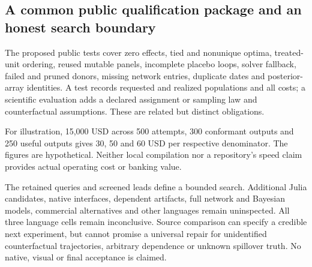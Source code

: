 \subsection{A common public qualification package and an honest search boundary}
The proposed public tests cover zero effects, tied and nonunique optima,
treated-unit ordering, reused mutable panels, incomplete placebo loops,
solver fallback, failed and pruned donors, missing network entries,
duplicate dates and posterior-array identities. A test records requested
and realized populations and all costs; a scientific evaluation adds a
declared assignment or sampling law and counterfactual assumptions.
These are related but distinct obligations.\citep{exec25_synthcross_choice}

For illustration, 15,000 USD across 500 attempts, 300 conformant outputs
and 250 useful outputs gives 30, 50 and 60 USD per respective denominator.
The figures are hypothetical. Neither local compilation nor a repository's
speed claim provides actual operating cost or banking value.
\citep{exec25_synthcross_choice}

The retained queries and screened leads define a bounded search. Additional
Julia candidates, native interfaces, dependent artifacts, full network and
Bayesian models, commercial alternatives and other languages remain
uninspected. All three language cells remain inconclusive. Source comparison
can specify a credible next experiment, but cannot promise a universal
repair for unidentified counterfactual trajectories, arbitrary dependence
or unknown spillover truth. No native, visual or final acceptance is claimed.
\citep{exec25_synthcross_choice}
